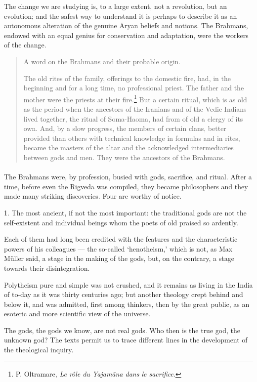 \documentclass[a4paper, 11pt, oneside, english]{article}
\begin{document}
The change we are studying is, to a large extent, not a revolution, but an evolution; and the safest way to understand it is perhaps to describe it as an autonomous alteration of the genuine Āryan beliefs and notions. The Brahmans, endowed with an equal genius for conservation and adaptation, were the workers of the change.
\begin{quotation}
\small
A word on the Brahmans and their probable origin.

The old rites of the family, offerings to the domestic fire, had, in the beginning and for a long time, no professional priest. The father and the mother were the priests at their fire.\footnote{P. Oltramare, \emph{Le rôle du Yajamāna dans le sacrifice}.} But a certain ritual, which is as old as the period when the ancestors of the Iranians and of the Vedic Indians lived together, the ritual of Soma-Haoma, had from of old a clergy of its own. And, by a slow progress, the members of certain clans, better provided than others with technical knowledge in formulas and in rites, became the masters of the altar and the acknowledged intermediaries between gods and men. They were the ancestors of the Brahmans.
\end{quotation}
\paragraph{}
The Brahmans were, by profession, busied with gods, sacrifice, and ritual. After a time, before even the Rigveda was compiled, they became philosophers and they made many striking discoveries. Four are worthy of notice.

1. The most ancient, if not the most important: the traditional gods are not the self-existent and individual beings whom the poets of old praised so ardently.

Each of them had long been credited with the features and the characteristic powers of his colleagues --- the so-called `henotheism,' which is not, as Max Müller said, a stage in the making of the gods, but, on the contrary, a stage towards their disintegration.

Polytheism pure and simple was not crushed, and it remains as living in the India of to-day as it was thirty centuries ago; but another theology crept behind and below it, and was admitted, first among thinkers, then by the great public, as an esoteric and more scientific view of the universe.

The gods, the gods we know, are not real gods. Who then is the true god, the unknown god? The texts permit us to trace different lines in the development of the theological inquiry.
\end{document}
